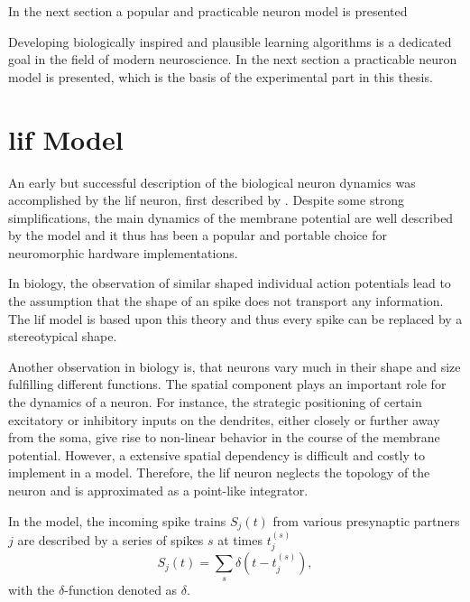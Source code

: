 In the next section a popular and practicable neuron model is presented 

Developing biologically inspired and plausible learning algorithms is a dedicated goal in the field of modern neuroscience. In the next section a practicable neuron model is presented, which is the basis of the experimental part in this thesis.

\section{\gls{lif} Model}

An early but successful description of the biological neuron dynamics was accomplished by the \gls{lif} neuron, first described by \cite{lapicque1907recherches}. Despite some strong simplifications, the main dynamics of the membrane potential are well described by the model and it thus has been a popular and portable choice for neuromorphic hardware implementations.

In biology, the observation of similar shaped individual action potentials lead to the assumption that the shape of an spike does not transport any information. The \gls{lif} model is based upon this theory and thus every spike can be replaced by a stereotypical shape.

Another observation in biology is, that neurons vary much in their shape and size fulfilling different functions. The spatial component plays an important role for the dynamics of a neuron. For instance, the strategic positioning of certain excitatory or inhibitory inputs on the dendrites, either closely or further away from the soma, give rise to non-linear behavior in the course of the membrane potential. However, a extensive spatial dependency is difficult and costly to implement in a model. Therefore, the \gls{lif} neuron neglects the topology of the neuron and is approximated as a point-like integrator. 

In the model, the incoming spike trains $S_j(t)$ from various presynaptic partners $j$ are described by a series of spikes $s$ at times $t_j^{(s)}$
\begin{equation}
S_j(t) = \sum_s \delta(t - t_j^{(s)}),
\end{equation}
with the $\delta$-function denoted as $\delta$. 

